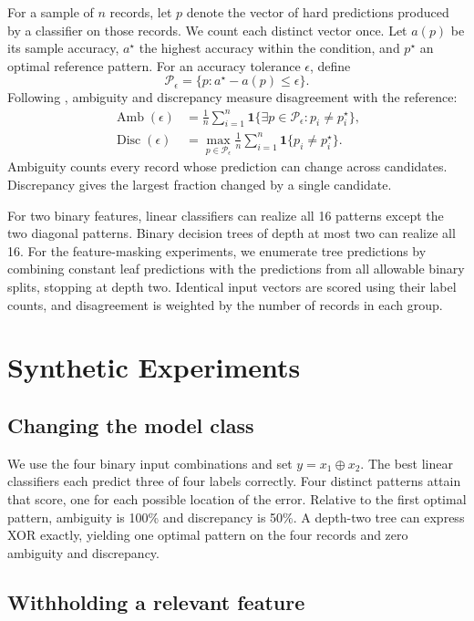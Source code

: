 \documentclass{article}
\begin{document}
For a sample of \(n\) records, let \(p\) denote the vector of hard predictions produced by a classifier on those records. We count each distinct vector once. Let \(a(p)\) be its sample accuracy, \(a^\star\) the highest accuracy within the condition, and \(p^\star\) an optimal reference pattern. For an accuracy tolerance \(\epsilon\), define
\[
\mathcal P_\epsilon = \{p : a^\star - a(p) \leq \epsilon\}.
\]
Following \citet{marx2020}, ambiguity and discrepancy measure disagreement with the reference:
\begin{align*}
\operatorname{Amb}(\epsilon)
&= \frac{1}{n}\sum_{i=1}^{n}
   \mathbf{1}\{\exists p\in\mathcal P_\epsilon:p_i\ne p_i^\star\},\\
\operatorname{Disc}(\epsilon)
&= \max_{p\in\mathcal P_\epsilon}
   \frac{1}{n}\sum_{i=1}^{n}\mathbf{1}\{p_i\ne p_i^\star\}.
\end{align*}
Ambiguity counts every record whose prediction can change across candidates. Discrepancy gives the largest fraction changed by a single candidate.

For two binary features, linear classifiers can realize all 16 patterns except the two diagonal patterns. Binary decision trees of depth at most two can realize all 16. For the feature-masking experiments, we enumerate tree predictions by combining constant leaf predictions with the predictions from all allowable binary splits, stopping at depth two. Identical input vectors are scored using their label counts, and disagreement is weighted by the number of records in each group.

\section{Synthetic Experiments}

\subsection{Changing the model class}

We use the four binary input combinations and set \(y=x_1\oplus x_2\). The best linear classifiers each predict three of four labels correctly. Four distinct patterns attain that score, one for each possible location of the error. Relative to the first optimal pattern, ambiguity is 100\% and discrepancy is 50\%. A depth-two tree can express XOR exactly, yielding one optimal pattern on the four records and zero ambiguity and discrepancy.

\subsection{Withholding a relevant feature}
\end{document}
